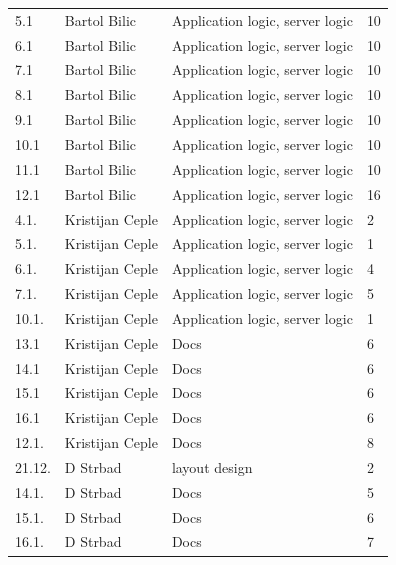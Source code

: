 \begin{longtable}{llll}
			5.1              & Bartol Bilic                  & Application logic, server logic & 10        \\
			6.1              & Bartol Bilic                  & Application logic, server logic & 10        \\
			7.1              & Bartol Bilic                  & Application logic, server logic & 10        \\
			8.1              & Bartol Bilic                  & Application logic, server logic & 10        \\
			9.1              & Bartol Bilic                  & Application logic, server logic & 10        \\
			10.1             & Bartol Bilic                  & Application logic, server logic & 10        \\
			11.1             & Bartol Bilic                  & Application logic, server logic & 10        \\
			12.1             & Bartol Bilic                  & Application logic, server logic & 16        \\
			4.1.             & Kristijan Ceple               & Application logic, server logic & 2         \\
			5.1.             & Kristijan Ceple               & Application logic, server logic & 1         \\
			6.1.             & Kristijan Ceple               & Application logic, server logic & 4         \\
			7.1.             & Kristijan Ceple               & Application logic, server logic & 5         \\
			10.1.            & Kristijan Ceple               & Application logic, server logic & 1         \\
			13.1             & Kristijan Ceple               & Docs                           & 6         \\
			14.1             & Kristijan Ceple               & Docs                            & 6         \\
			15.1             & Kristijan Ceple               & Docs                            & 6         \\
			16.1             & Kristijan Ceple               & Docs                            & 6         \\
			12.1.            & Kristijan Ceple               & Docs                            & 8         \\
			21.12.           & D Strbad                      & layout design                   & 2         \\
			14.1.            & D Strbad                      & Docs                            & 5         \\
			15.1.            & D Strbad                      & Docs                            & 6         \\
			16.1.            & D Strbad                      & Docs                            & 7        
		\end{longtable}
				
